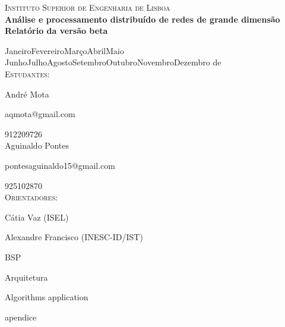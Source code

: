 \documentclass[a4paper,10pt]{report}
\begin{document}
\clearpage

\vskip0.5cm                
\begin{center}
  {\LARGE \textsc{Instituto Superior de Engenharia de Lisboa}}
  \\[1cm]
  {\huge \bf Análise e processamento distribuído de redes de grande dimensão}
  \\[0.5cm]
  {\large {\bf Relatório da versão beta}}
  
  {\large
    \ifcase\month\or Janeiro\or Fevereiro\or Março\or Abril\or Maio\or
      Junho\or Julho\or Agosto\or Setembro\or Outubro\or Novembro\or Dezembro
    \fi
    \space de\space\the\year}
    \\[0.5cm]
    \textsc{Estudantes:}
    
    André Mota
    
    aqmota@gmail.com
    
    912209726
    \\[0.25cm]
    Aguinaldo Pontes
    
    pontesaguinaldo15@gmail.com
    
    925102870
    \\[0.5cm]
    \textsc{Orientadores:}
    
    Cátia Vaz (ISEL)
    
    Alexandre Francisco (INESC-ID/IST)

\end{center}

\clearpage
{}

\tableofcontents







{BSP}

{Arquitetura}


{Algorithms}
{application}

\appendix
{apendice}



\end{document}
